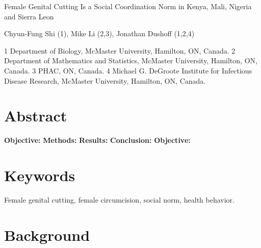 \documentclass[
]{article}
\author{}
\date{}
\begin{document}
Female Genital Cutting Is a Social Coordination Norm in Kenya, Mali, Nigeria and Sierra Leon


Chyun-Fung Shi (1), Mike Li (2,3), Jonathan Dushoff (1,2,4)

1 Department of Biology, McMaster University, Hamilton, ON, Canada.
2 Department of Mathematics and Statistics, McMaster University, Hamilton, ON, Canada.
3 PHAC, ON, Canada.
4 Michael G. DeGroote Institute for Infectious Disease Research, McMaster University, Hamilton, ON, Canada.

\hypertarget{abstract}{%
\section{Abstract}\label{abstract}}

\textbf{Objective:}  
\textbf{Methods:} 
\textbf{Results:} 
\textbf{Conclusion:} 
\textbf{Objective:} 

\hypertarget{keywords}{%
\section{Keywords}\label{keywords}}

Female genital cutting, female circumcision, social norm, health behavior.

\hypertarget{background}{%
\section{Background}\label{background}}
\end{document}
